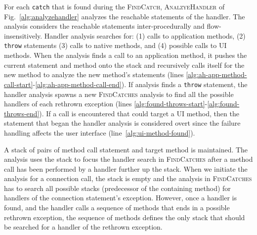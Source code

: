 For each \lstinline!catch! that is found during the
\textsc{FindCatch}, \textsc{AnalzyeHandler} of
Fig.~\ref{alg:analyzehandler} analyzes the reachable statements of
the handler. The analysis considers the reachable statements
inter-procedurally and flow-insens\-itively.  Handler analysis
searches for: (1) calls to application methods, (2) \lstinline!throw!
statements (3) calls to native methods, and (4) possible calls to UI
methods. When the analysis finds a call to an application method, it
pushes the current statement and method onto the stack and recursively
calls itself for the new method to analyze the new method's statements
(lines
\ref{alg:ah-app-method-call-start}-\ref{alg:ah-app-method-call-end}).
If analysis finds a \lstinline!throw!  statement, the handler analysis
spawns a new \textsc{FindCatches} analysis to find all the possible
handlers of each rethrown exception (lines
\ref{alg:found-throws-start}-\ref{alg:found-throws-end}).  
If a call is encountered that
could target a UI method, then the statement that began the handler
analysis is considered overt since the failure handling affects
the user interface (line~\ref{alg:ui-method-found}).



A stack of pairs of method call statement and target method is
maintained.  The analysis uses the stack to focus the handler search
in \textsc{FindCatches} after a method call has been performed by a
handler further up the stack. When we initiate the analysis for a
connection call, the stack is empty and the analysis in
\textsc{FindCatches} has to search all possible stacks (predecessor of
the containing method) for handlers of the connection statement's
exception.  However, once a handler is found, and the handler calls a
sequence of methods that ends in a possible rethrown exception, the
sequence of methods defines the only stack that should be searched for
a handler of the rethrown exception.


